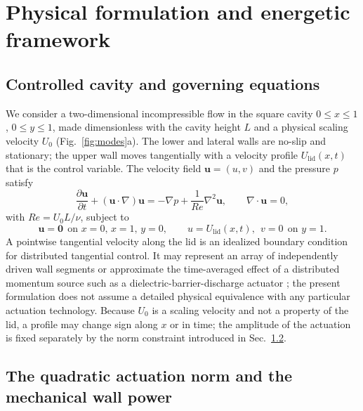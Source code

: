 \documentclass[11pt,a4paper]{article}
\begin{document}
\section{Physical formulation and energetic framework}
\label{sec:formulation}

\subsection{Controlled cavity and governing equations}

We consider a two-dimensional incompressible flow in the square cavity
$0\le x\le 1$, $0\le y\le 1$, made dimensionless with the cavity height $L$ and a
physical scaling velocity $U_0$ (Fig.~\ref{fig:modes}a). The lower and lateral walls are no-slip and stationary;
the upper wall moves tangentially with a velocity profile
$U_{\mathrm{lid}}(x,t)$ that is the control variable. The velocity field
$\mathbf{u}=(u,v)$ and the pressure $p$ satisfy
\begin{equation}
\frac{\partial\mathbf{u}}{\partial t}+(\mathbf{u}\cdot\nabla)\mathbf{u}
=-\nabla p+\frac{1}{Re}\nabla^{2}\mathbf{u},
\qquad \nabla\cdot\mathbf{u}=0,
\label{eq:ns}
\end{equation}
with $Re=U_0L/\nu$, subject to
\begin{equation}
\mathbf{u}=\mathbf{0}\ \ \text{on } x=0,\,x=1,\,y=0,
\qquad
u=U_{\mathrm{lid}}(x,t),\ \ v=0\ \ \text{on } y=1 .
\label{eq:bc}
\end{equation}
A pointwise tangential velocity along the lid is an idealized boundary condition
for distributed tangential control. It may represent an array of independently
driven wall segments or approximate the time-averaged effect of a distributed
momentum source such as a dielectric-barrier-discharge actuator
\cite{corke2010dbd}; the present formulation does not assume a detailed physical
equivalence with any particular actuation technology. Because $U_0$ is a scaling
velocity and not a property of the lid, a profile may change sign along $x$ or in
time; the amplitude of the actuation is fixed separately by the norm constraint
introduced in Sec.~\ref{sec:norm}.

\subsection{The quadratic actuation norm and the mechanical wall power}
\label{sec:norm}
\end{document}
